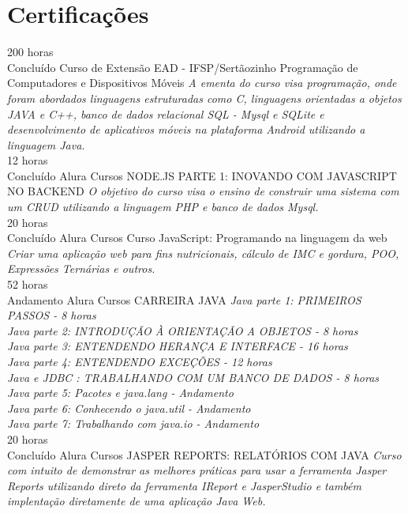 \documentclass[]{friggeri-cv}
\begin{document}
\section{Certificações}
\begin{entrylist}

    \entry
    {200 horas \\Concluído}
    {Curso de Extensão EAD - IFSP/Sertãozinho}
    {Programação de Computadores e Dispositivos Móveis}
    {\emph{A ementa do curso visa programação, onde foram abordados linguagens estruturadas como C, linguagens orientadas a objetos JAVA e C++, banco de dados relacional SQL - Mysql e SQLite e desenvolvimento de aplicativos móveis na plataforma Android utilizando a linguagem Java.}}
    \\
    \entry
    {12 horas \\Concluído}
    {Alura Cursos}
    {NODE.JS PARTE 1: INOVANDO COM JAVASCRIPT NO BACKEND}
    {\emph{O objetivo do curso visa o ensino de construir uma sistema com um CRUD utilizando a linguagem PHP e banco de dados Mysql.}}
    \\
    \entry
    {20 horas \\Concluído}
    {Alura Cursos}
    {Curso JavaScript: Programando na linguagem da web}
    {\emph{Criar uma aplicação web para fins nutricionais, cálculo de IMC e gordura, POO, Expressões Ternárias e outros. }}
    \\
    \entry
    {52 horas \\Andamento}
    {Alura Cursos}
    {CARREIRA JAVA}
    {\emph{
    Java parte 1: PRIMEIROS PASSOS - 8 horas\\
    Java parte 2: INTRODUÇÃO À ORIENTAÇÃO A OBJETOS - 8 horas \\
    Java parte 3: ENTENDENDO HERANÇA E INTERFACE - 16 horas \\
    Java parte 4: ENTENDENDO EXCEÇÕES - 12 horas\\
    Java e JDBC : TRABALHANDO COM UM BANCO DE DADOS - 8 horas\\
    Java parte 5: Pacotes e java.lang - Andamento \\
    Java parte 6: Conhecendo o java.util - Andamento\\
    Java parte 7: Trabalhando com java.io - Andamento}}
    \\
    \entry
    {20 horas \\Concluído}
    {Alura Cursos}
    {JASPER REPORTS: RELATÓRIOS COM JAVA}
    {\emph{Curso com intuito de demonstrar as melhores práticas para usar a ferramenta Jasper Reports utilizando direto da ferramenta IReport e JasperStudio e também implentação diretamente de uma aplicação Java Web. }}

\end{entrylist}
\end{document}
